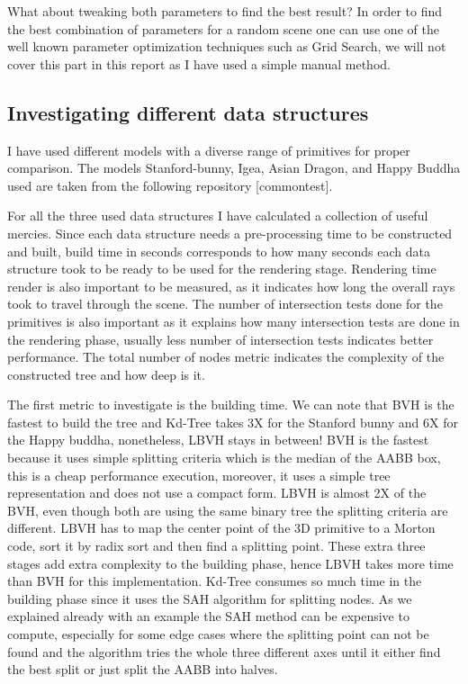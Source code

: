 \documentclass[11pt,a4paper]{article}
\begin{document}
What about tweaking both parameters to find the best result? In order to find the best combination of parameters for a random scene one can use one of the well known parameter optimization techniques such as  Grid Search, we will not cover this part in this report as I have used a simple manual method. 

\subsection{Investigating different data structures}
I have used different models with a diverse range of primitives for proper comparison. The models Stanford-bunny, Igea, Asian Dragon, and Happy Buddha used are taken from the following repository [commontest].
\\
\noindent

For all the three used data structures I have calculated a collection of useful mercies.  Since each data structure needs a pre-processing time to be constructed and built, build time in seconds corresponds to how many seconds each data structure took to be ready to be used for the rendering stage. Rendering time render is also important to be measured, as it indicates how long the overall rays took to travel through the scene. The number of intersection tests done for the primitives is also important as it explains how many intersection tests are done in the rendering phase, usually less number of intersection tests indicates better performance. The total number of nodes metric indicates the complexity of the constructed tree and how deep is it. 
\\
\noindent

The first metric to investigate is the building time. We can note that BVH is the fastest to build the tree and Kd-Tree takes 3X for the Stanford bunny and 6X for the Happy buddha, nonetheless, LBVH stays in between! BVH is the fastest because it uses simple splitting criteria which is the median of the AABB box, this is a cheap performance execution, moreover, it uses a simple tree representation and does not use a compact form. LBVH is almost 2X of the BVH, even though both are using the same binary tree the splitting criteria are different. LBVH has to map the center point of the 3D primitive to a Morton code, sort it by radix sort and then find a splitting point. These extra three stages add extra complexity to the building phase, hence LBVH takes more time than BVH for this implementation. Kd-Tree consumes so much time in the building phase since it uses the SAH algorithm for splitting nodes. As we explained already with an example the SAH method can be expensive to compute, especially for some edge cases where the splitting point can not be found and the algorithm tries the whole three different axes until it either find the best split or just split the AABB into halves. 
\\
\noindent
\end{document}
